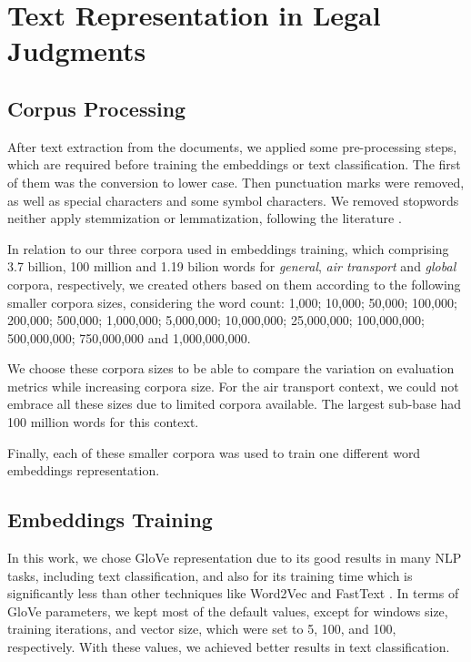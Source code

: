\section{Text Representation in Legal Judgments}


\subsection{Corpus Processing}

After text extraction from the documents, we applied some pre-processing steps, which are required before training the embeddings or text classification. The first of them was the conversion to lower case. Then punctuation marks were removed, as well as special characters and some symbol characters. We removed stopwords neither apply stemmization or lemmatization, following the literature  \cite{Mikolov2013, Pennington2014}.

In relation to our three corpora used in embeddings training, which comprising 3.7 billion, 100 million  and 1.19 bilion words for \emph{general}, \emph{air transport} and \emph{global} corpora, respectively, we created others based on them according to the following smaller corpora sizes, considering the word count: 1,000; 10,000; 50,000; 100,000; 200,000; 500,000; 1,000,000; 5,000,000; 10,000,000; 25,000,000; 100,000,000; 500,000,000; 750,000,000 and 1,000,000,000.

We choose these corpora sizes to be able to compare the variation on evaluation metrics while increasing corpora size. For the air transport context, we could not embrace all these sizes due to limited corpora available. The largest sub-base had  100 million words for this context. 

Finally, each of these smaller corpora was used to train one different word embeddings representation.

\subsection{Embeddings Training}

In this work, we chose GloVe representation due to its good results in many NLP tasks, including text classification, and also for its training time which is significantly less than other techniques like Word2Vec and FastText \cite{Pennington2014}.  
In terms of GloVe parameters, we kept most of the default values, except for windows size, training iterations, and vector size, which were set to 5, 100, and 100, respectively. With these values, we achieved better results in text classification.

